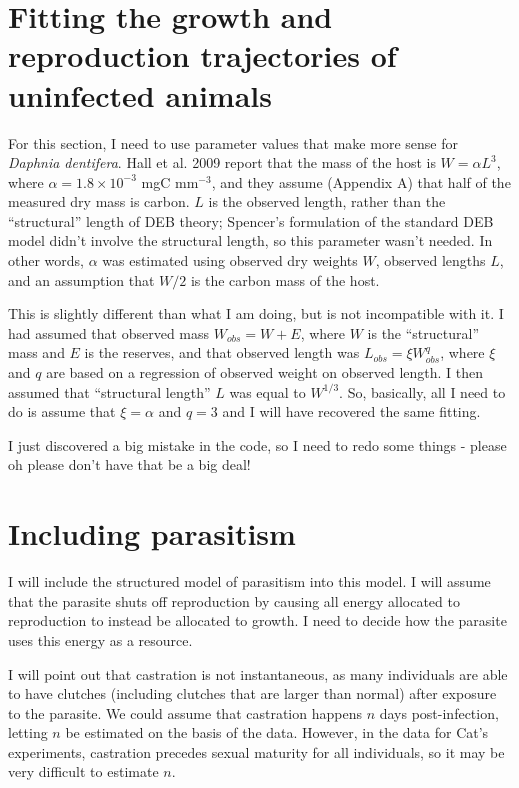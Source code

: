 \documentclass[12pt,reqno,final,pdftex]{amsart}\usepackage[]{graphicx}\usepackage[]{color}
\theoremstyle{plain}
\numberwithin{equation}{part}
\begin{document}
\section*{Fitting the growth and reproduction trajectories of uninfected animals}
For this section, I need to use parameter values that make more sense for \emph{Daphnia dentifera}.
Hall et al. 2009 report that the mass of the host is $W=\alpha L^3$, where $\alpha=1.8\times 10^{-3}$ mgC mm$^{-3}$, and they assume (Appendix A) that half of the measured dry mass is carbon.
$L$ is the observed length, rather than the ``structural'' length of DEB theory; Spencer's formulation of the standard DEB model didn't involve the structural length, so this parameter wasn't needed.
In other words, $\alpha$ was estimated using observed dry weights $W$, observed lengths $L$, and an assumption that $W/2$ is the carbon mass of the host.

This is slightly different than what I am doing, but is not incompatible with it.
I had assumed that observed mass $W_{obs} = W + E$, where $W$ is the ``structural'' mass and $E$ is the reserves, and that observed length was $L_{obs} = \xi W_{obs}^q$, where $\xi$ and $q$ are based on a regression of observed weight on observed length.
I then assumed that ``structural length'' $L$ was equal to $W^{1/3}$.
So, basically, all I need to do is assume that $\xi=\alpha$ and $q=3$ and I will have recovered the same fitting.





I just discovered a big mistake in the code, so I need to redo some things - please oh please don't have that be a big deal!

\clearpage
\section*{Including parasitism}
I will include the structured model of parasitism into this model.
I will assume that the parasite shuts off reproduction by causing all energy allocated to reproduction to instead be allocated to growth.
I need to decide how the parasite uses this energy as a resource.

I will point out that castration is not instantaneous, as many individuals are able to have clutches (including clutches that are larger than normal) after exposure to the parasite.
We could assume that castration happens $n$ days post-infection, letting $n$ be estimated on the basis of the data.
However, in the data for Cat's experiments, castration precedes sexual maturity for all individuals, so it may be very difficult to estimate $n$.
\end{document}
